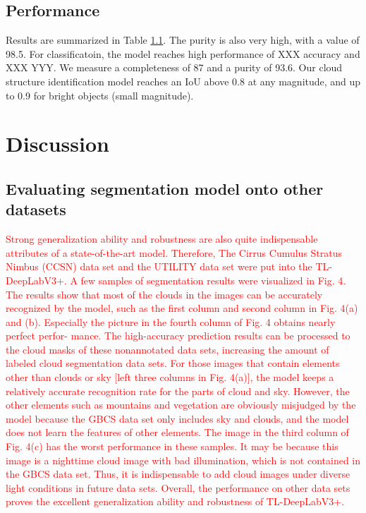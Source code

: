 \documentclass[amt, article]{copernicus}
\begin{document}
\subsection{Performance}



Results are summarized in Table \ref{}. The purity is also
very high, with a value of 98.5. For classificatoin, the model reaches high performance of XXX accuracy and XXX YYY. We measure a completeness of 87 and a purity of 93.6. Our cloud structure identification model reaches an IoU above 0.8 at any magnitude, and up to 0.9 for bright objects (small magnitude).

\section{Discussion}

\subsection{Evaluating segmentation model onto other datasets}

\textcolor{red}{Strong generalization ability and robustness are also quite
indispensable attributes of a state-of-the-art model. Therefore,
The Cirrus Cumulus Stratus Nimbus (CCSN) data set and the
UTILITY data set were put into the TL-DeepLabV3+. A few
samples of segmentation results were visualized in Fig. 4. The
results show that most of the clouds in the images can be
accurately recognized by the model, such as the first column
and second column in Fig. 4(a) and (b). Especially the picture
in the fourth column of Fig. 4 obtains nearly perfect perfor-
mance. The high-accuracy prediction results can be processed
to the cloud masks of these nonannotated data sets, increasing
the amount of labeled cloud segmentation data sets. For those
images that contain elements other than clouds or sky [left
three columns in Fig. 4(a)], the model keeps a relatively
accurate recognition rate for the parts of cloud and sky.
However, the other elements such as mountains and vegetation
are obviously misjudged by the model because the GBCS data
set only includes sky and clouds, and the model does not learn
the features of other elements. The image in the third column
of Fig. 4(c) has the worst performance in these samples. It may
be because this image is a nighttime cloud image with bad
illumination, which is not contained in the GBCS data set.
Thus, it is indispensable to add cloud images under diverse
light conditions in future data sets. Overall, the performance
on other data sets proves the excellent generalization ability
and robustness of TL-DeepLabV3+.}
\end{document}

